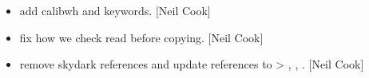 \documentclass[a4paper,10pt,english]{report}
\begin{document}
\begin{itemize}
\item {} 
 \sphinxhyphen{} add calibwh and 
keywords. {[}Neil Cook{]}

\item {} 
 \sphinxhyphen{} fix how we check read before copying. {[}Neil
Cook{]}

\item {} 
 \sphinxhyphen{} remove skydark references
and update references to  \textendash{}\textgreater{} , ,
. {[}Neil Cook{]}

\end{itemize}
\end{document}
